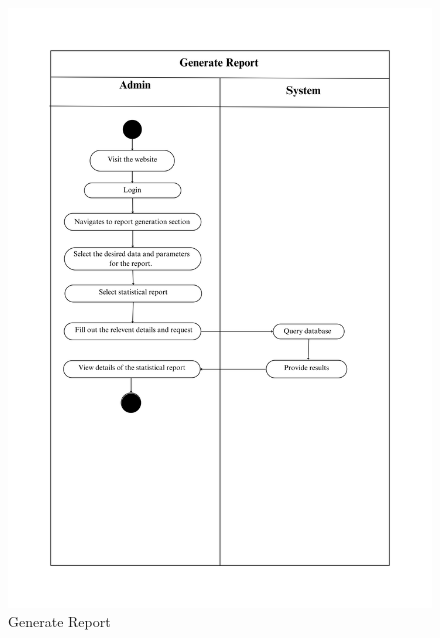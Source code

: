 \begin{figure}[h]
    \centering
    \includegraphics[width=1\textwidth]{Images/Activity Diagrams/33 Generate Report.png}
    \caption{Generate Report}
    \label{fig:activity-generate-report}
\end{figure}

